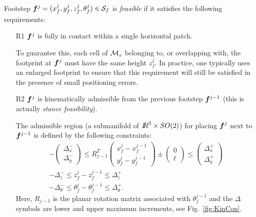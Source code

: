 Footstep ${\bm{f}}^j=(x_f^j,y_f^j,z_f^j,\theta_f^j) \in {\cal S}_f$ is \textit{feasible} if it satisfies the following requirements:   

\begin{itemize}

\smallskip
\item[R1] ${\bm{f}}^j$ is fully in contact within a single horizontal patch.

\smallskip
To guarantee this, each cell of ${\cal M}_{z}$ belonging to, or overlapping with, the footprint at ${\bm{f}}^j$ must have the same height $z_{f}^j$. In practice, one typically uses an enlarged footprint to ensure that this requirement will still be satisfied in the presence of small positioning errors.

\smallskip
\item[R2] ${\bm{f}}^j$ is kinematically admissible from the previous footstep ${\bm{f}}^{j-1}$ (this is actually {\em stance feasibility}).

\smallskip
The admissible region (a submanifold of ${I\!\!R}^3 \times SO(2)$) for placing ${\bm{f}}^{j}$ next to ${\bm{f}}^{j-1}$ is defined by the following constraints:
\begin{gather} 
-\begin{pmatrix}
\Delta_x^- \\[5pt] \Delta_y^-
\end{pmatrix}
\le
R_{j-1}^T \begin{pmatrix}
x_f^j - x_f^{j-1} \\[5pt] y_f^j - y_f^{j-1}
\end{pmatrix}
\pm \begin{pmatrix}
0 \\ \ell
\end{pmatrix}
\le
\begin{pmatrix}
\Delta_x^+ \\[5pt] \Delta_y^+
\end{pmatrix} \label{eq:XYAdmissible}\\[5pt]
-\Delta_z^- \le z_f^j - z_f^{j-1} \le \Delta_z^+
\label{eq:ZAdmissible}\\[5pt]
-\Delta_\theta^- \le \theta_f^j - \theta_f^{j-1} \le \Delta_\theta^+. \label{eq:ThetaAdmissible}
\end{gather}
Here, $R_{j-1}$ is the planar rotation matrix associated with $\theta_f^{j-1}$ and the $\Delta$ symbols are lower and upper maximum increments, see Fig.~\ref{fig:KinCon}.


\end{itemize}
